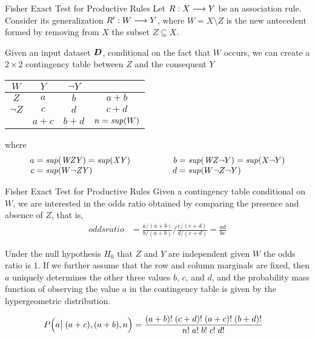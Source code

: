 \begin{frame}{F{i}sher Exact Test for Productive Rules}
Let $R: X\arule Y$ be an association rule. Consider its
generalization $R': W \arule Y$, where $W = X\setminus Z$ is the
new antecedent formed by removing from $X$ the subset $Z \subseteq
X$. 

\medskip
Given an input dataset ${\boldsymbol D}$, conditional on the fact that $W$
occurs, we can create a $2 \times 2$ contingency table between $Z$
and the consequent $Y$
\begin{center}
\begin{tabular}{|c|cc||c|}
    \hline
    $W$ & $Y$ & $\neg Y$ & \\
    \hline
    $Z$ & $a$ & $b$ & $a+b$\\
  $\neg Z$ & $c$ & $d$ & $c+d$\\
  \hline\hline
  & $a+c$ & $b+d$ & $n=\mathit{sup}(W)$\\
  \hline
  \end{tabular}
\end{center}
where
\begin{alignat*}{3}
  a & = \mathit{sup}(\mathit{WZY}) = \mathit{sup}(\mathit{XY}) & \qquad\qquad
  b & = \mathit{sup}(\mathit{WZ}\neg Y) = \mathit{sup}(X\neg Y) \\[-3pt]
  c & = \mathit{sup}(W \neg \mathit{ZY}) & \qquad\qquad
  d & =\mathit{sup}(W \neg Z \neg Y)
\end{alignat*}
\end{frame}


\begin{frame}{F{i}sher Exact Test for Productive Rules}
Given a contingency table conditional on $W$,
we are interested in the odds ratio obtained by
comparing the presence and absence of $Z$, that is,
\begin{align*}
  oddsratio & = \frac{a/(a+b)}{b/(a+b)} \Biggl/ \frac{c/(c+d)}{d/(c+d)} =
  \frac{ad}{bc}
\end{align*}

Under the null hypothesis $H_0$ that
$Z$ and $Y$ are independent given $W$ the odds ratio is 1. 
If we further assume that the row and column marginals are
f\/{i}xed, then $a$ uniquely determines the other three values $b$, $c$, and
$d$, and the probability mass function of observing the value $a$ in the
contingency table is given by the hypergeometric distribution.  

\begin{align*}
  P\Bigl(a \bigl|\; (a+c), (a+b), n\Bigr) &=
  \frac{(a+b)!\;(c+d)!\;(a+c)!\;(b+d)!}{n!\;a!\;b!\;c!\;d!}
\end{align*}
\end{frame}



